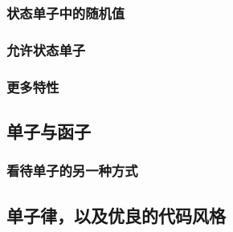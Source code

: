 \documentclass[./main.tex]{subfiles}
\begin{document}
\subsubsection*{状态单子中的随机值}

\subsubsection*{允许状态单子}

\subsubsection*{更多特性}

\subsection*{单子与函子}

\subsubsection*{看待单子的另一种方式}

\subsection*{单子律，以及优良的代码风格}
\end{document}
